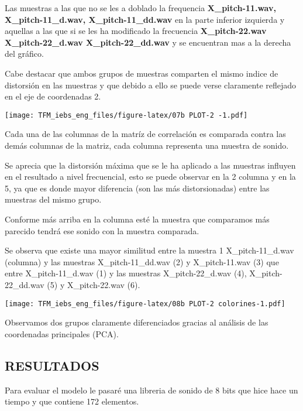 \documentclass[
]{article}
\begin{document}
Las muestras a las que no se les a doblado la frequencia
\textbf{X\_pitch-11.wav, X\_pitch-11\_d.wav, X\_pitch-11\_dd.wav} en la
parte inferior izquierda y aquellas a las que si se les ha modificado la
frecuencia \textbf{X\_pitch-22.wav X\_pitch-22\_d.wav
X\_pitch-22\_dd.wav} y se encuentran mas a la derecha del gráfico.

Cabe destacar que ambos grupos de muestras comparten el mismo indice de
distorsión en las muestras y que debido a ello se puede verse claramente
reflejado en el eje de coordenadas 2.

\texttt{[image: TFM\_iebs\_eng\_files/figure-latex/07b PLOT-2 -1.pdf]}

Cada una de las columnas de la matríz de correlación es comparada contra
las demás columnas de la matriz, cada columna representa una muestra de
sonido.

Se aprecia que la distorsión máxima que se le ha aplicado a las muestras
influyen en el resultado a nivel frecuencial, esto se puede observar en
la 2 columna y en la 5, ya que es donde mayor diferencia (son las más
distorsionadas) entre las muestras del mismo grupo.

Conforme más arriba en la columna esté la muestra que comparamos más
parecido tendrá ese sonido con la muestra comparada.

Se observa que existe una mayor similitud entre la muestra 1
X\_pitch-11\_d.wav (columna) y las muestras X\_pitch-11\_dd.wav (2) y
X\_pitch-11.wav (3) que entre X\_pitch-11\_d.wav (1) y las muestras
X\_pitch-22\_d.wav (4), X\_pitch-22\_dd.wav (5) y X\_pitch-22.wav (6).

\texttt{[image: TFM\_iebs\_eng\_files/figure-latex/08b PLOT-2 colorines-1.pdf]}

Observamos dos grupos claramente diferenciados gracias al análisis de
las coordenadas principales (PCA).

\newpage

\hypertarget{resultados}{%
\subsection{RESULTADOS}\label{resultados}}

Para evaluar el modelo le pasaré una libreria de sonido de 8 bits que
hice hace un tiempo y que contiene 172 elementos.
\end{document}
